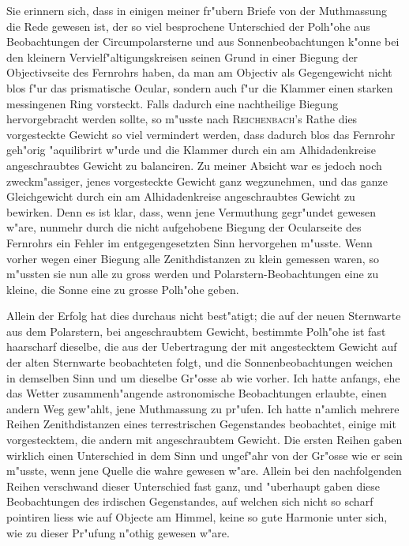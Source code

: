 \documentclass[12pt,a4paper]{article}
\begin{document}
Sie erinnern sich, dass in einigen meiner fr"ubern Briefe von der Muthmassung die Rede gewesen
ist, der so viel besprochene Unterschied der Polh"ohe aus Beobachtungen der Circumpolarsterne und aus
Sonnenbeobachtungen k"onne bei den kleinern Vervielf"altigungskreisen seinen Grund in einer Biegung
der Objectivseite des Fernrohrs haben, da man am Objectiv als Gegengewicht nicht blos f"ur das
prismatische Ocular, sondern auch f"ur die Klammer einen starken messingenen Ring vorsteckt. Falls
dadurch eine nachtheilige Biegung hervorgebracht werden sollte, so m"usste nach \textsc{Reichenbach}'s Rathe dies
vorgesteckte Gewicht so viel vermindert werden, dass dadurch blos das Fernrohr geh"orig "aquilibrirt
w"urde und die Klammer durch ein am Alhidadenkreise angeschraubtes Gewicht zu balanciren. Zu
meiner Absicht war es jedoch noch zweckm"assiger, jenes vorgesteckte Gewicht ganz wegzunehmen, und
das ganze Gleichgewicht durch ein am Alhidadenkreise angeschraubtes Gewicht zu bewirken. Denn es
ist klar, dass, wenn jene Vermuthung gegr"undet gewesen w"are, nunmehr durch die nicht aufgehobene
Biegung der Ocularseite des Fernrohrs ein Fehler im entgegengesetzten Sinn hervorgehen m"usste. Wenn
vorher wegen einer Biegung alle Zenithdistanzen zu klein gemessen waren, so m"ussten sie nun alle zu
gross werden und Polarstern-Beobachtungen eine zu kleine, die Sonne eine zu grosse Polh"ohe geben.

Allein der Erfolg hat dies durchaus nicht best"atigt; die auf der neuen Sternwarte aus dem Polarstern,
bei angeschraubtem Gewicht, bestimmte Polh"ohe ist fast haarscharf dieselbe, die aus der Uebertragung
der mit angestecktem Gewicht auf der alten Sternwarte beobachteten folgt, und die Sonnenbeobachtungen
weichen in demselben Sinn und um dieselbe Gr"osse ab wie vorher. Ich hatte anfangs, ehe das
Wetter zusammenh"angende astronomische Beobachtungen erlaubte, einen andern Weg gew"ahlt, jene
Muthmassung zu pr"ufen. Ich hatte n"amlich mehrere Reihen Zenithdistanzen eines terrestrischen Gegenstandes
beobachtet, einige mit vorgestecktem, die andern mit angeschraubtem Gewicht. Die ersten
Reihen gaben wirklich einen Unterschied in dem Sinn und ungef"ahr von der Gr"osse wie er sein m"usste,
wenn jene Quelle die wahre gewesen w"are. Allein bei den nachfolgenden Reihen verschwand dieser
Unterschied fast ganz, und "uberhaupt gaben diese Beobachtungen des irdischen Gegenstandes, auf welchen
sich nicht so scharf pointiren liess wie auf Objecte am Himmel, keine so gute Harmonie unter sich,
wie zu dieser Pr"ufung n"othig gewesen w"are.
\end{document}
